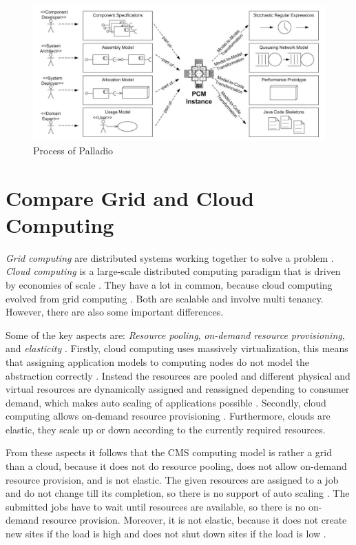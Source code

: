 \begin{figure}
	\centering
	\includegraphics[width=1\linewidth]{images/palladio}
	\caption[]{Process of Palladio \cite{BECKER20093}}
	\label{fig:palladio}
\end{figure}



\section{Compare Grid and Cloud Computing}
\label{grid_cloud}
\textit{Grid computing} are distributed systems working together to solve a problem \cite{mollamotalebi2013grid}.
\textit{Cloud computing} is a large-scale distributed computing paradigm that is driven by economies of scale \cite{foster2008cloud}.
They have a lot in common, because cloud computing evolved from grid computing \cite{foster2008cloud}. Both are scalable and involve multi tenancy.
However, there are also some important differences.

Some of the key aspects are: \textit{Resource pooling}, \textit{on-demand resource provisioning}, and \textit{elasticity} \cite{foster2008cloud}.
Firstly, cloud computing uses massively virtualization, this means that assigning application models to computing nodes do not model the abstraction correctly \cite{cloud_sim}. Instead the resources are pooled and different physical and virtual resources are dynamically assigned and reassigned depending to consumer demand, which makes auto scaling of applications possible \cite{foster2008cloud}.
Secondly, cloud computing allows on-demand resource provisioning \cite{foster2008cloud}. Furthermore, clouds are elastic, they scale up or down according to the currently required resources.

From these aspects it follows that the CMS computing model is rather a grid than a cloud, because it does not do resource pooling, does not allow on-demand resource provision, and is not elastic.
The given resources are assigned to a job and do not change till its completion, so there is no support of auto scaling \cite{wlcg_update}. The submitted jobs have to wait until resources are available, so there is no on-demand resource provision. Moreover, it is not elastic, because it does not create new sites if the load is high and does not shut down sites if the load is low \cite{wlcg_update}.


